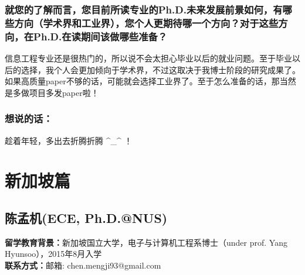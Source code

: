 \documentclass[a4paper,UTF8]{book}
\begin{document}
    \subsubsection*{就您的了解而言，您目前所读专业的Ph.D.未来发展前景如何，有哪些方向（学术界和工业界），您个人更期待哪一个方向？对于这些方向，在Ph.D.在读期间该做哪些准备？}
    信息工程专业还是很热门的，所以说不会太担心毕业以后的就业问题。至于毕业以后的选择，我个人会更加倾向于学术界，不过这取决于我博士阶段的研究成果了。如果高质量paper不够的话，可能就会选择工业界了。至于怎么准备的话，那当然是多做项目多发paper啦！
    
    \subsubsection{想说的话：}
    趁着年轻，多出去折腾折腾 \^{}\_\^{} ！

\clearpage
\section{新加坡篇}

\subsection{陈孟机(ECE, Ph.D.@NUS)}
    \textbf{留学教育背景：}新加坡国立大学，电子与计算机工程系博士（under prof. Yang Hyunsoo），2015年8月入学\\
    \textbf{联系方式：}邮箱: chen.mengji93@gmail.com
\end{document}
